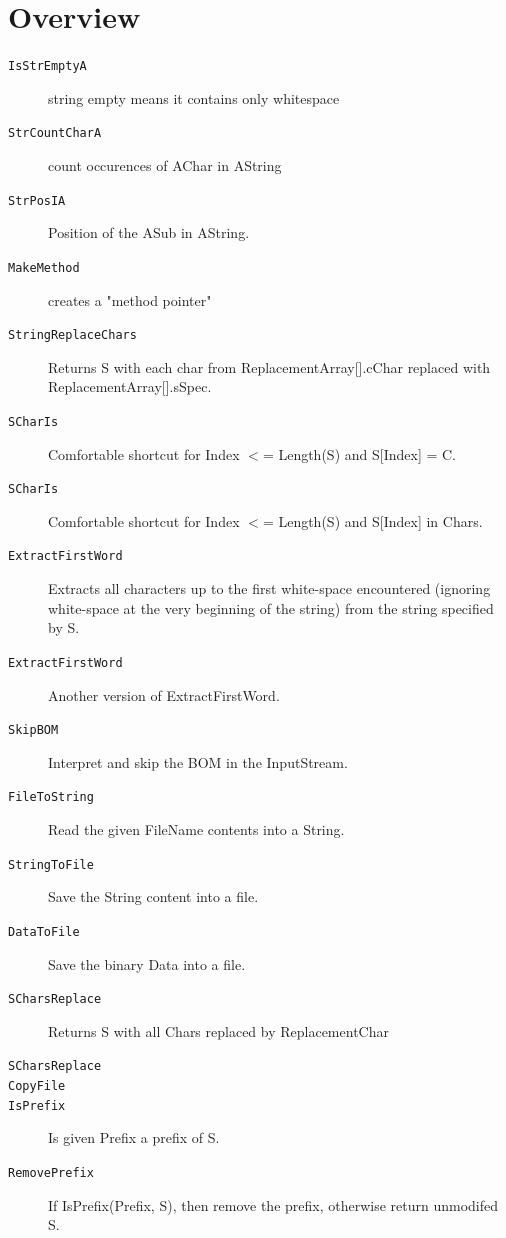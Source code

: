 \documentclass{report}
\begin{document}
\section{Overview}
\begin{description}
\item[\texttt{\begin{ttfamily}TCharReplacement\end{ttfamily} Record}]
\end{description}
\begin{description}
\item[\texttt{IsStrEmptyA}]string empty means it contains only whitespace
\item[\texttt{StrCountCharA}]count occurences of AChar in AString
\item[\texttt{StrPosIA}]Position of the ASub in AString.
\item[\texttt{MakeMethod}]creates a "method pointer"
\item[\texttt{StringReplaceChars}]Returns S with each char from ReplacementArray[].cChar replaced with ReplacementArray[].sSpec.
\item[\texttt{SCharIs}]Comfortable shortcut for Index {$<$}= Length(S) and S[Index] = C.
\item[\texttt{SCharIs}]Comfortable shortcut for Index {$<$}= Length(S) and S[Index] in Chars.
\item[\texttt{ExtractFirstWord}]Extracts all characters up to the first white{-}space encountered (ignoring white{-}space at the very beginning of the string) from the string specified by S.
\item[\texttt{ExtractFirstWord}]Another version of ExtractFirstWord.
\item[\texttt{SkipBOM}]Interpret and skip the BOM in the InputStream.
\item[\texttt{FileToString}]Read the given FileName contents into a String.
\item[\texttt{StringToFile}]Save the String content into a file.
\item[\texttt{DataToFile}]Save the binary Data into a file.
\item[\texttt{SCharsReplace}]Returns S with all Chars replaced by ReplacementChar
\item[\texttt{SCharsReplace}]
\item[\texttt{CopyFile}]
\item[\texttt{IsPrefix}]Is given Prefix a prefix of S.
\item[\texttt{RemovePrefix}]If IsPrefix(Prefix, S), then remove the prefix, otherwise return unmodifed S.

\end{description}
\end{document}
